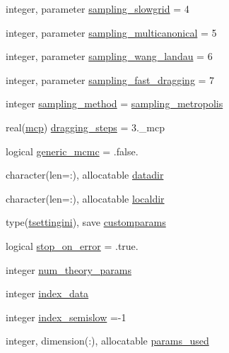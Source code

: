 \begin{DoxyCompactItemize}
\item 
integer, parameter \mbox{\hyperlink{namespacesettings_af39c7332606eeaed1affbeb9715b903e}{sampling\+\_\+slowgrid}} = 4
\item 
integer, parameter \mbox{\hyperlink{namespacesettings_ab692e79a9d756d1ebf42dba033da3c9b}{sampling\+\_\+multicanonical}} = 5
\item 
integer, parameter \mbox{\hyperlink{namespacesettings_a88e45b9a2ab5447d2cb82b74672906de}{sampling\+\_\+wang\+\_\+landau}} = 6
\item 
integer, parameter \mbox{\hyperlink{namespacesettings_a9cd020650f7e83b9fda45b3bfdda34bf}{sampling\+\_\+fast\+\_\+dragging}} = 7
\item 
integer \mbox{\hyperlink{namespacesettings_a01e6691ce72977baf15dd20434012f65}{sampling\+\_\+method}} = \mbox{\hyperlink{namespacesettings_a7fbe5e0e8194b33c8990365eafe20bed}{sampling\+\_\+metropolis}}
\item 
real(\mbox{\hyperlink{namespacesettings_a341fa0fe410054f78630c33e118669bf}{mcp}}) \mbox{\hyperlink{namespacesettings_ab8364bc8c9e772b73f258e33676806ec}{dragging\+\_\+steps}} = 3.\+\_\+mcp
\item 
logical \mbox{\hyperlink{namespacesettings_af46cd3e56cf132b962ba2a208f29b04f}{generic\+\_\+mcmc}} = .false.
\item 
character(len=\+:), allocatable \mbox{\hyperlink{namespacesettings_a2deacc581b6841445fd044dab25ef389}{datadir}}
\item 
character(len=\+:), allocatable \mbox{\hyperlink{namespacesettings_a464bacc2f6a7b48655e92110d990d457}{localdir}}
\item 
type(\mbox{\hyperlink{structsettings_1_1tsettingini}{tsettingini}}), save \mbox{\hyperlink{namespacesettings_a7f5934d4eca8e396a1c744c7fa88bcba}{customparams}}
\item 
logical \mbox{\hyperlink{namespacesettings_a4acafe693ea8cedb2044a2ce90c9469f}{stop\+\_\+on\+\_\+error}} = .true.
\item 
integer \mbox{\hyperlink{namespacesettings_a362078e6b11a6c4f0eff6aee65cf046a}{num\+\_\+theory\+\_\+params}}
\item 
integer \mbox{\hyperlink{namespacesettings_a80a8fe2bea1b08d8109b2cfcb09cb02c}{index\+\_\+data}}
\item 
integer \mbox{\hyperlink{namespacesettings_a56f153f87bcbfcf9717c0efc77c20fb8}{index\+\_\+semislow}} =-\/1
\item 
integer, dimension(\+:), allocatable \mbox{\hyperlink{namespacesettings_a2d59bb48a1012143991ce9093fc76be5}{params\+\_\+used}}

\end{DoxyCompactItemize}
